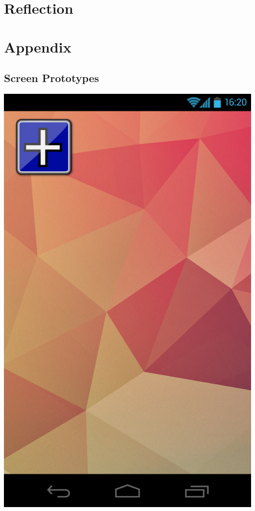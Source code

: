 \documentclass[pdftex,12pt,a4paper]{report}
\begin{document}
\chapter{Reflection}
\chapter{Appendix}
\section*{Screen Prototypes}

\includegraphics[scale=0.18]{Screens/00-Launch.png}
\end{document}
